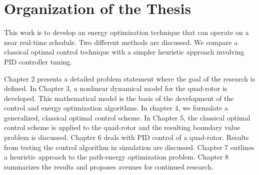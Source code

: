 \section{Organization of the Thesis}

This work is to develop an energy optimization technique that can operate on a near real-time schedule. Two different methods are discussed. We compare a classical optimal control technique with a simpler heuristic approach involving PID controller tuning. 

Chapter 2 presents a detailed problem statement where the goal of the research is defined. In Chapter 3, a nonlinear dynamical model for the quad-rotor is developed. This mathematical model is the basis of the development of the control and energy optimization algorithms. In chapter 4, we formulate a generalized, classical optimal control scheme. In Chapter 5, the classical optimal control scheme is applied to the quad-rotor and the resulting boundary value problem is discussed. Chapter 6 deals with PID control of a quad-rotor. Results from testing the control algorithm in simulation are discussed. Chapter 7 outlines a heuristic approach to the path-energy optimization problem. Chapter 8 summarizes the results and proposes avenues for continued research.












